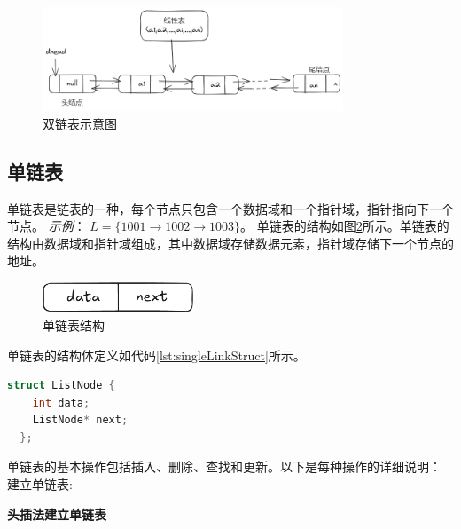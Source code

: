 \documentclass[lang=cn,newtx,10pt,scheme=chinese]{../elegantbook}
\begin{document}
\begin{figure}[h]
  \centering
  \includegraphics[width=0.8\textwidth]{./image/doubleLink.png}
  \caption{双链表示意图}
  \label{fig:double_linked_list}
\end{figure}

\subsection{单链表}
单链表是链表的一种，每个节点只包含一个数据域和一个指针域，指针指向下一个节点。
\textit{示例}：
$L = \{1001 \rightarrow 1002 \rightarrow 1003\}$。
单链表的结构如图\ref{fig:singleLinkStruct}所示。单链表的结构由数据域和指针域组成，其中数据域存储数据元素，指针域存储下一个节点的地址。
\begin{figure}[h]
  \centering
  \includegraphics[width=0.4\textwidth]{./figure/pdf/cropped/singleStruct.pdf}
  \caption{单链表结构}
  \label{fig:singleLinkStruct}
\end{figure}
单链表的结构体定义如代码\ref{lst:singleLinkStruct}所示。
\begin{lstlisting}[language=C++, caption={单链表结构体定义}, label={lst:singleLinkStruct}]
  struct ListNode {
    int data;
    ListNode* next;
  };
\end{lstlisting}
单链表的基本操作包括插入、删除、查找和更新。以下是每种操作的详细说明：
建立单链表:

  \textbf{头插法建立单链表}
\end{document}

